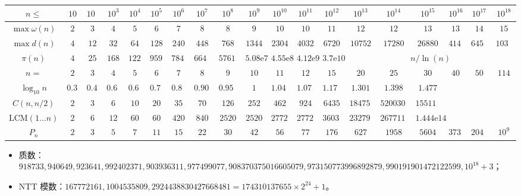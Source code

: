 \begin{table}[H]
	\centering \small \renewcommand{}
	\begin{tabular}{c|c|c|c|c|c|c|c|c|c|c|c|c|c|c|c|c|c|c} \toprule
		$n \leq$ & $10$ & $100$ & $10^{3}$ & $10^{4}$ & $10^{5}$ & $10^{6}$ & $10^{7}$ & $10^{8}$ & $10^{9}$ & $10^{10}$ & $10^{11}$ & $10^{12}$ & $10^{13}$ & $10^{14}$ & $10^{15}$ & $10^{16}$ & $10^{17}$ & $10^{18}$ \\ \midrule
		$\max\omega(n)$ & $2$ & $3$ & $4$ & $5$ & $6$ & $7$ & $8$ & $8$ & $9$ & $10$ & $10$ & $11$ &  $12$ & $12$ & $13$ & $13$ & $14$ & $15$ \\ 
		$\max{d(n)}$ & $4$ & $12$ & $32$ & $64$ & $128$ & $240$ & $ 448$ & $768$ & $1344$ & $2304$ & $4032$ & $6720$ & $10752$ & $17280$ & $26880$ & $41472$ & $64512$ & $103680$ \\ 
		$\pi(n)$ & $4$ & $25$ & $168$ & $1229$ & $9592$ & $78498$ & $664579$ & $5761455$ & $5.08 \mathrm e 7$ & $4.55 \mathrm e 8$ & $4.12 \mathrm e 9$ & $3.7 \mathrm e {10}$ & \multicolumn{6}{c}{$n / \ln(n)$} \\ \midrule
		$n = $ & $2$ & $3$ & $4$ & $5$ & $6$ & $7$ & $8$ & $9$ & $10$ & $11$ & $12$ & $15$ & $20$ & $25$ & $30$ & $40$ & $50$ & $114$ \\ \midrule
		$\log_{10} n$ & $0.301$ & $0.477$ & $0.602$ & $0.698$ & $0.778$ & $0.845$ & $0.903$ & $0.954$ & $1$ & $1.041$ & $1.079$ & $1.176$ & $1.301$ & $1.398$ & $1.477$ \\
		$C(n,n/2)$ & $2$ & $3$ & $6$ & $10$ & $20$ & $35$ & $70$ & $126$ & $252$ & $462$ & $924$ & $6435$ & $184756$ & $5200300$ & $155117520$ \\
		$\mathrm{LCM}(1\dots n)$ & $2$ & $6$ & $12$ & $60$ & $60$ & $420$ & $840$ & $2520$ & $2520$ & $27720$ & $27720$ & $360360$ & $232792560$ & $26771144400$ & $1.444\mathrm e14$ \\ 
		$P_n$ & $2$ & $3$ & $5$ & $7$ & $11$ & $15$ & $22$ & $30$ & $42$ & $56$ & $77$ & $176$ & $627$ & $1958$ & $5604$ & $37338$ & $204226$ & $10^9$ \\ \bottomrule
	\end{tabular}
\end{table}

\tightlist
\begin{itemize}
	\item 质数：$918733, 940649, 923641, 992402371, 903936311, 977499077, 908370375016605079, 973150773996892879, 990191901472122599, 10^{18} + 3$；
	\item NTT 模数：$167772161, 1004535809, 2924438830427668481 = 174310137655 \times 2^{24} + 1$。
\end{itemize}
